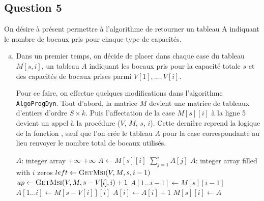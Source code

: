 \documentclass[12pt,a4paper]{article}
\begin{document}
\subsection*{Question 5}
On d\'esire \`a pr\'esent permettre \`a l'algorithme de retourner un tableau A indiquant le nombre de bocaux pris pour chaque type de capacit\'es.

\begin{enumerate}[a)]
 \item Dans un premier temps, on d\'ecide de placer dans chaque case du tableau $M[s,i]$, un tableau $A$ indiquant les bocaux pris pour la capacit\'e totale $s$ et des capacit\'es de bocaux prises parmi $V[1],\dotsc,V[i]$. 
 
 Pour ce faire, on effectue quelques modifications dans l'algorithme \texttt{AlgoProgDyn}. Tout d'abord, la matrice $M$ devient une matrice de tableaux d'entiers d'ordre $S \times k$.  Puis l'affectation de la case $M[s][i]$ \`a la ligne 5 devient un appel \`a la proc\'edure ($V$, $M$, $s$, $i$). Cette derni\`ere reprend la logique de la fonction , sauf que l'on cr\'ee le tableau $A$ pour la case correspondante au lieu renvoyer le nombre total de bocaux utilis\'es. 
 
 \begin{algorithm}
\begin{algorithmic}[1]
    \State $A$: integer array
        \State {}
        \State \Return $+\infty$
        \State \Return $+\infty$
    \Else
        \State $A \gets M[s][i]$
        \State \Return $\sum_{j=1}^{i} A[j]$
    \EndIf
\EndFunction
\Statex
{}
    \State $A$: integer array filled with $i$ zeros
        \State $left \gets \Call{GetMsi}{V, M, s, i-1}$
        \State $up \gets \Call{GetMsi}{V, M, s-V[i], i}+1$
            \State $A[1\dotsc i-1] \gets M[s][i-1]$
        \Else
            \State $A[1\dotsc i] \gets M[s-V[i]][i]$
            \State $A[i] \gets A[i] + 1$
        \EndIf
    \EndIf
    \State $M[s][i] \gets A$
\EndFunction
\end{algorithmic}
\end{algorithm}
 

\end{enumerate}
\end{document}
